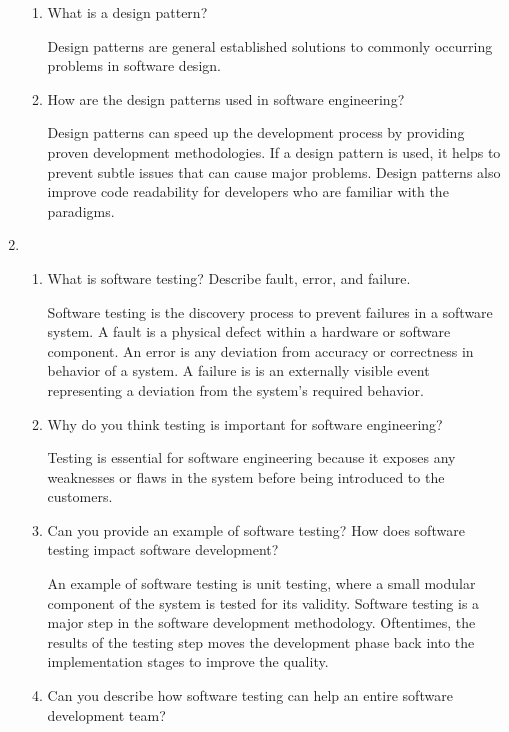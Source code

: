 \documentclass[12pt]{article}
\begin{document}
\begin{enumerate}
\begin{enumerate}[start=1,align=left]
      \item What is a design pattern? 

      Design patterns are general established solutions to commonly occurring problems in software design.

      \item How are the design patterns used in software engineering?

      Design patterns can speed up the development process by providing proven development methodologies. If a design pattern is used, it helps to prevent subtle issues that can cause major problems. Design patterns also improve code readability for developers who are familiar with the paradigms.

    \end{enumerate}

    \item
    \begin{enumerate}[start=1,align=left]

      \item What is software testing? Describe fault, error, and failure.

      Software testing is the discovery process to prevent failures in a software system. A fault is a physical defect within a hardware or software component. An error is any deviation from accuracy or correctness in behavior of a system. A failure is is an externally visible event representing a deviation from the system’s required behavior.

      \item Why do you think testing is important for software engineering? 

      Testing is essential for software engineering because it exposes any weaknesses or flaws in the system before being introduced to the customers.

      \item Can you provide an example of software testing? How does software testing impact software development? 

      An example of software testing is unit testing, where a small modular component of the system is tested for its validity. Software testing is a major step in the software development methodology. Oftentimes, the results of the testing step moves the development phase back into the implementation stages to improve the quality.

      \item Can you describe how software testing can help an entire software development team?


\end{enumerate}
\end{enumerate}
\end{document}
